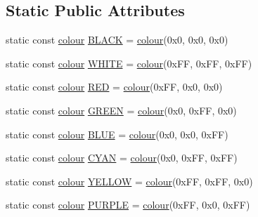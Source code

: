 \subsection*{Static Public Attributes}
\begin{DoxyCompactItemize}
\item 
static const \hyperlink{classglpp_1_1colour}{colour} \hyperlink{classglpp_1_1colour_a891850c908ec4f2cedcf5be236659fe9}{B\+L\+A\+CK} = \hyperlink{classglpp_1_1colour}{colour}(0x0, 0x0, 0x0)
\item 
static const \hyperlink{classglpp_1_1colour}{colour} \hyperlink{classglpp_1_1colour_a31dee30a00a739220ec67ece4e91b028}{W\+H\+I\+TE} = \hyperlink{classglpp_1_1colour}{colour}(0x\+F\+F, 0x\+F\+F, 0x\+F\+F)
\item 
static const \hyperlink{classglpp_1_1colour}{colour} \hyperlink{classglpp_1_1colour_ad553b7109926527e6f04af61ec0f29fc}{R\+ED} = \hyperlink{classglpp_1_1colour}{colour}(0x\+F\+F, 0x0, 0x0)
\item 
static const \hyperlink{classglpp_1_1colour}{colour} \hyperlink{classglpp_1_1colour_ab673e5d7eb73740b26f7a6c16c013acc}{G\+R\+E\+EN} = \hyperlink{classglpp_1_1colour}{colour}(0x0, 0x\+F\+F, 0x0)
\item 
static const \hyperlink{classglpp_1_1colour}{colour} \hyperlink{classglpp_1_1colour_a3bf5061510f05ae45b9e48d8f22b6957}{B\+L\+UE} = \hyperlink{classglpp_1_1colour}{colour}(0x0, 0x0, 0x\+F\+F)
\item 
static const \hyperlink{classglpp_1_1colour}{colour} \hyperlink{classglpp_1_1colour_afe1154e51ccabefeacab80a8fbdc6aaa}{C\+Y\+AN} = \hyperlink{classglpp_1_1colour}{colour}(0x0, 0x\+F\+F, 0x\+F\+F)
\item 
static const \hyperlink{classglpp_1_1colour}{colour} \hyperlink{classglpp_1_1colour_a2b8d287c0ff80c6b11dcf4d7bcca4bce}{Y\+E\+L\+L\+OW} = \hyperlink{classglpp_1_1colour}{colour}(0x\+F\+F, 0x\+F\+F, 0x0)
\item 
static const \hyperlink{classglpp_1_1colour}{colour} \hyperlink{classglpp_1_1colour_a1c7c31cd3ab210492c25f09270648b95}{P\+U\+R\+P\+LE} = \hyperlink{classglpp_1_1colour}{colour}(0x\+F\+F, 0x0, 0x\+F\+F)
\end{DoxyCompactItemize}
